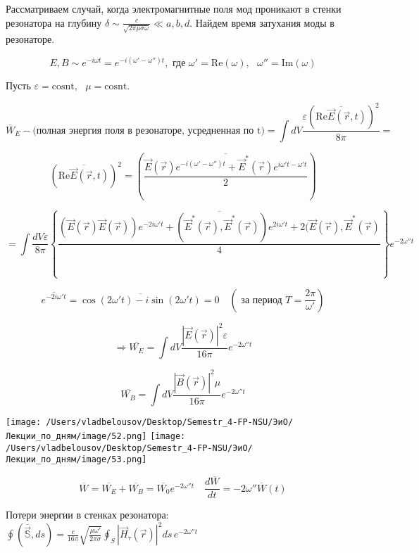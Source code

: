 \documentclass[12pt, a4paper]{report}
\begin{document}
Рассматриваем случай, когда электромагнитные поля мод проникают в стенки резонатора на глубину \(\displaystyle  \delta \sim \frac{c }{\sqrt{2 \pi \mu \sigma \omega}} \ll a, b,d  \). Найдем время затухания моды в резонаторе. 

\[ E,B \sim e ^{-i \omega t } = e^{ - i (\omega ' - \omega '')t} , \text{ где } \omega' = \mathrm{Re} (\omega) , \text{ } \omega'' = \mathrm{Im} (\omega)     \] 

Пусть \( \varepsilon = \mathrm{cosnt}, \text{ }  \mu = \mathrm{cosnt}.   \) 

\[ \overline{W}_E - \text{(полная энергия поля в резонаторе, усредненная по t)} = \int dV \frac{\varepsilon (\overline{\mathrm{Re}\vec{E} (\vec{r } ,t ) }  ) ^2 }{8 \pi}  \boxed{=}  \] 

\[(\overline{\mathrm{Re}\vec{E} (\vec{r } ,t ) }  ) ^2 = \left( \overline{\frac{\vec{E }  (\vec{r } ) e^{- i (\omega ' - \omega '')t} + \vec{E } ^{* }  (\vec{r } ) e ^{ i \omega ' t - \omega ' t} }{2} }   \right)  \] 

\[ \boxed{= } \int  \frac{dV \varepsilon}{8 \pi}  \left\{\overline{ \frac{(\vec{E } (\vec{r }) \vec{E } (\vec{r } ) ) e^{- 2 i \omega 't } + (\vec{E } ^{* } (\vec{r } ), \vec{E } ^{* } (\vec{r } )) e ^{ 2 i \omega ' t} + 2 (\vec{E } (\vec{r } ), \vec{E} ^{* } (\vec{r } ) }{4} }   \right\} e^{- 2 \omega ''t }  \] 

\[ \overline{e ^{ -2 i \omega ' t } }  =\overline{\cos (2 \omega ' t)- i \sin (2 \omega ' t)} = 0 \quad (\text{ за период } T =\frac{ 2\pi}{\omega'} )     \] 

\[ \Rightarrow \overline{W_E} = \int dV \frac{\left\lvert \vec{E } (\vec{r } ) \right\rvert ^2 \varepsilon}{1 6\pi } e^{- 2 \omega '' t}     \] 

\[ \overline{W_B} = \int dV \frac{\left\lvert \vec{B } (\vec{r } ) \right\rvert ^2 \mu}{1 6\pi } e^{- 2 \omega '' t}    \] 


\begin{center}
    \texttt{[image: /Users/vladbelousov/Desktop/Semestr\_4-FP-NSU/ЭиО/Лекции\_по\_дням/image/52.png]}
    \texttt{[image: /Users/vladbelousov/Desktop/Semestr\_4-FP-NSU/ЭиО/Лекции\_по\_дням/image/53.png]}
\end{center}

\[ \overline{W }  = \overline{W_E} + \overline{W_B}  = \overline{W_0 } e^{ - 2 \omega '' t}  \quad  \frac{d \overline{ W}  }{dt } = - 2 \omega '' \overline{W }(t)  \] 

Потери энергии в стенках резонатора: \( \displaystyle \oint \left( \overline{\vec{\mathbb{S}} },ds \right)   = \frac{c}{ 16 \pi}  \sqrt{\frac{ \mu \omega '}{2 \pi \sigma} } \oint_{S} \left\lvert \vec{H } _{\tau } (\vec{r})   \right\rvert ^2 ds \,  e^{ - 2 \omega '' t} \) 
\end{document}
